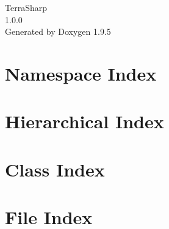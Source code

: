\documentclass[twoside]{book}
\newcommand{\+}{\discretionary{\mbox{\scriptsize$\hookleftarrow$}}{}{}}
\newcommand{\clearemptydoublepage}{%
    \newpage{\pagestyle{empty}\cleardoublepage}%
  }
\begin{document}
  \raggedbottom
    \hypersetup{pageanchor=false,
                bookmarksnumbered=true,
                pdfencoding=unicode
               }
  \begin{titlepage}
  \vspace*{7cm}
  \begin{center}%
  {\Large Terra\+Sharp}\\
  [1ex]\large 1.\+0.\+0 \\
  \vspace*{1cm}
  {\large Generated by Doxygen 1.9.5}\\
  \end{center}
  \end{titlepage}
  \clearemptydoublepage
  \tableofcontents
  \clearemptydoublepage
  \hypersetup{pageanchor=true}
\chapter{Namespace Index}

\chapter{Hierarchical Index}

\chapter{Class Index}

\chapter{File Index}

\end{document}
